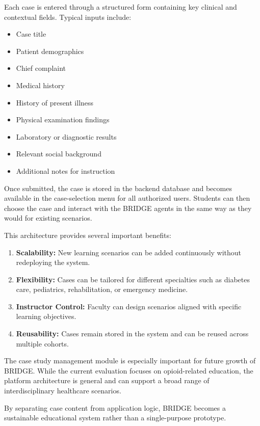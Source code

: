 \documentclass[12pt]{article}
\begin{document}
Each case is entered through a structured form containing key clinical and contextual fields. Typical inputs include:

\begin{itemize}
    \item Case title
    \item Patient demographics
    \item Chief complaint
    \item Medical history
    \item History of present illness
    \item Physical examination findings
    \item Laboratory or diagnostic results
    \item Relevant social background
    \item Additional notes for instruction
\end{itemize}

Once submitted, the case is stored in the backend database and becomes available in the case-selection menu for all authorized users. Students can then choose the case and interact with the BRIDGE agents in the same way as they would for existing scenarios.

This architecture provides several important benefits:

\begin{enumerate}
    \item \textbf{Scalability:} New learning scenarios can be added continuously without redeploying the system.
    \item \textbf{Flexibility:} Cases can be tailored for different specialties such as diabetes care, pediatrics, rehabilitation, or emergency medicine.
    \item \textbf{Instructor Control:} Faculty can design scenarios aligned with specific learning objectives.
    \item \textbf{Reusability:} Cases remain stored in the system and can be reused across multiple cohorts.
\end{enumerate}

The case study management module is especially important for future growth of BRIDGE. While the current evaluation focuses on opioid-related education, the platform architecture is general and can support a broad range of interdisciplinary healthcare scenarios.

By separating case content from application logic, BRIDGE becomes a sustainable educational system rather than a single-purpose prototype.
\end{document}

